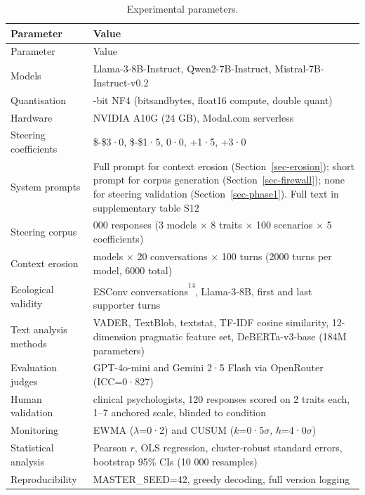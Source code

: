 \documentclass[
  10pt,
  a4paper,
  onecolumn]{article}
\begin{document}
\begin{longtable}[]{@{}
  >{\raggedright\arraybackslash}p{}
  >{\raggedright\arraybackslash}p{}@{}}
\caption{Experimental parameters.}\label{tbl-methods}\tabularnewline
\toprule\noalign{}
\begin{minipage}[b]{\linewidth}\raggedright
Parameter
\end{minipage} & \begin{minipage}[b]{\linewidth}\raggedright
Value
\end{minipage} \\
\midrule\noalign{}
\endfirsthead
\toprule\noalign{}
\begin{minipage}[b]{\linewidth}\raggedright
Parameter
\end{minipage} & \begin{minipage}[b]{\linewidth}\raggedright
Value
\end{minipage} \\
\midrule\noalign{}
\endhead
\bottomrule\noalign{}
\endlastfoot
Models & Llama-3-8B-Instruct, Qwen2-7B-Instruct,
Mistral-7B-Instruct-v0.2 \\
Quantisation & 4-bit NF4 (bitsandbytes, float16 compute, double
quant) \\
Hardware & NVIDIA A10G (24 GB), Modal.com serverless \\
Steering coefficients & \$-\$3·0, \$-\$1·5, 0·0, +1·5, +3·0 \\
System prompts & Full prompt for context erosion
(Section~\ref{sec-erosion}); short prompt for corpus generation
(Section~\ref{sec-firewall}); none for steering validation
(Section~\ref{sec-phase1}). Full text in supplementary table S12 \\
Steering corpus & 12 000 responses (3 models \(\times\) 8 traits
\(\times\) 100 scenarios \(\times\) 5 coefficients) \\
Context erosion & 3 models \(\times\) 20 conversations \(\times\) 100
turns (2000 turns per model, 6000 total) \\
Ecological validity & 200 ESConv
conversations\textsuperscript{\textsuperscript{14}}, Llama-3-8B, first
and last supporter turns \\
Text analysis methods & VADER, TextBlob, textstat, TF-IDF cosine
similarity, 12-dimension pragmatic feature set, DeBERTa-v3-base (184M
parameters) \\
Evaluation judges & GPT-4o-mini and Gemini 2·5 Flash via OpenRouter
(ICC=0·827) \\
Human validation & 2 clinical psychologists, 120 responses scored on 2
traits each, 1--7 anchored scale, blinded to condition \\
Monitoring & EWMA (\(\lambda\)=0·2) and CUSUM (\(k\)=0·5\(\sigma\),
\(h\)=4·0\(\sigma\)) \\
Statistical analysis & Pearson \(r\), OLS regression, cluster-robust
standard errors, bootstrap 95\% CIs (10 000 resamples) \\
Reproducibility & MASTER\_SEED=42, greedy decoding, full version
logging \\
\end{longtable}
\end{document}
